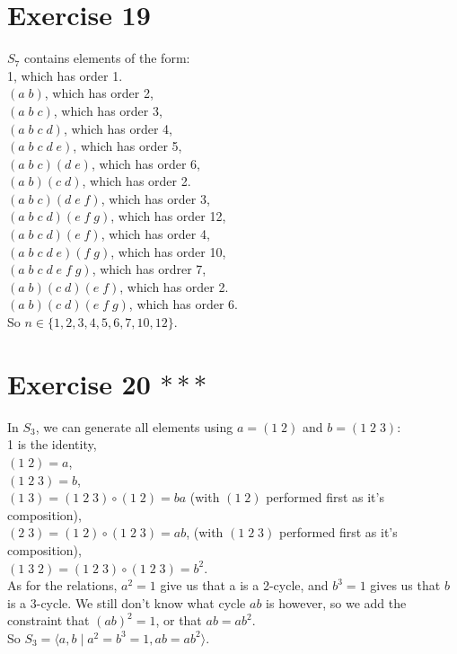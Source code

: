 \documentclass{article}
\begin{document}
    \section*{Exercise 19}
    $S_7$ contains elements of the form: \\ 
    1, which has order 1. \\
    $(a\;b)$, which has order 2, \\
    $(a\;b\;c)$, which has order 3, \\
    $(a\;b\;c\;d)$, which has order 4, \\
    $(a\;b\;c\;d\;e)$, which has order 5, \\
    $(a\;b\;c)(d\;e)$, which has order 6, \\
    $(a\;b)(c\;d)$, which has order 2. \\
    $(a\;b\;c)(d\;e\;f)$, which has order 3, \\
    $(a\;b\;c\;d)(e\;f\;g)$, which has order 12, \\
    $(a\;b\;c\;d)(e\;f)$, which has order 4, \\
    $(a\;b\;c\;d\;e)(f\;g)$, which has order 10, \\
    $(a\;b\;c\;d\;e\;f\;g)$, which has ordrer 7, \\
    $(a\;b)(c\;d)(e\;f)$, which has order 2. \\
    $(a\;b)(c\;d)(e\;f\;g)$, which has order 6. \\
    So $n \in \{ 1, 2, 3, 4, 5, 6, 7, 10, 12 \}$.
    

    \section*{Exercise 20 $***$}
    In $S_3$, we can generate all elements using $a = (1\;2)$
    and $b = (1\;2\;3)$: \\
    1 is the identity, \\
    $(1\;2) = a$, \\
    $(1\;2\;3) = b$, \\
    $(1\;3) = (1\;2\;3) \circ (1\;2) = ba$
    (with $(1\;2)$ performed first as it's composition), \\
    $(2\;3) = (1\;2) \circ (1\;2\;3) = ab$,
    (with $(1\;2\;3)$ performed first as it's composition), \\
    $(1\;3\;2) = (1\;2\;3) \circ (1\;2\;3) = b^2$. \\
    As for the relations, $a^2 = 1$ give us that a is a 2-cycle,
    and $b^3 = 1$ gives us that $b$ is a 3-cycle.
    We still don't know what cycle $ab$ is however, so we add the
    constraint that $(ab)^2 = 1$, or that $ab = ab^2$. \\
    So $S_3 = \langle a, b \mid a^2 = b^3 =1, ab = ab^2 \rangle$.

    
\end{document}
